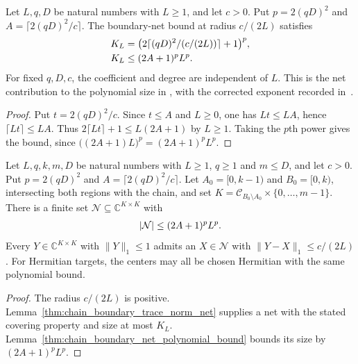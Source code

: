 \begin{lemma}
    \label{thm:chain_boundary_net_polynomial_bound}
    \leanok
    Let $L,q,D$ be natural numbers with $L\ge1$, and let $c>0$.
    Put $p=2(qD)^2$ and $A=\lceil2(qD)^2/c\rceil$. The boundary-net bound
    at radius $c/(2L)$ satisfies
    \begin{align}
        K_L & =\bigl(2\lceil(qD)^2/(c/(2L))\rceil+1\bigr)^p,\notag \\
        K_L & \le(2A+1)^pL^p.\notag
    \end{align}
    For fixed $q,D,c$, the coefficient and degree are independent of $L$.
    This is the net contribution to the polynomial size in
    \cite[Claim~2.7, source lines 519--527]{Landau2015Polynomial}, with the
    corrected exponent recorded in~\cite{gap:lvv13_trace_norm_net}.
\end{lemma}
\begin{proof}
    \leanok
    Put $t=2(qD)^2/c$. Since $t\le A$ and $L\ge0$, one has $Lt\le LA$,
    hence $\lceil Lt\rceil\le LA$. Thus
    $2\lceil Lt\rceil+1\le L(2A+1)$ by $L\ge1$.
    Taking the $p$th power gives the bound, since
    $\bigl((2A+1)L\bigr)^p=(2A+1)^pL^p$.
\end{proof}

\begin{theorem}
    \label{thm:chain_boundary_net_polynomial}
    \leanok
    Let $L,q,k,m,D$ be natural numbers with $L\ge1$, $q\ge1$ and $m\le D$,
    and let $c>0$. Put $p=2(qD)^2$ and $A=\lceil2(qD)^2/c\rceil$.
    Let $A_0=\lbrack0,k-1)$ and $B_0=\lbrack0,k)$, intersecting both regions with
    the chain, and set $K=\mathcal C_{B_0\setminus A_0}\times\{0,\ldots,m-1\}$.
    There is a finite set $\mathcal N\subseteq\mathbb C^{K\times K}$ with
    \begin{align}
        |\mathcal N|\le(2A+1)^pL^p.\notag
    \end{align}
    Every $Y\in\mathbb C^{K\times K}$ with $\|Y\|_1\le1$ admits an
    $X\in\mathcal N$ with $\|Y-X\|_1\le c/(2L)$.
    For Hermitian targets, the centers may all be chosen Hermitian with the
    same polynomial bound.
\end{theorem}
\begin{proof}
    \leanok
    The radius $c/(2L)$ is positive. Lemma~\ref{thm:chain_boundary_trace_norm_net}
    supplies a net with the stated covering property and size at most $K_L$.
    Lemma~\ref{thm:chain_boundary_net_polynomial_bound} bounds its size by
    $(2A+1)^pL^p$.
\end{proof}

